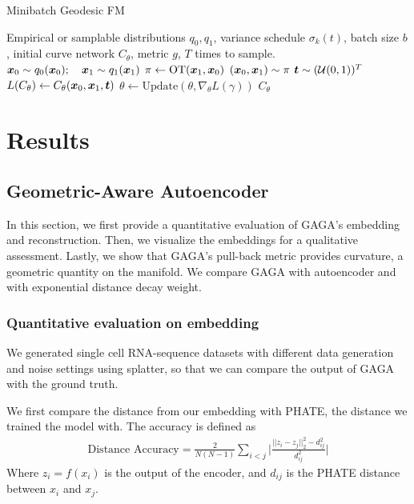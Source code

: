 \documentclass{article}
\theoremstyle{plain}
\theoremstyle{definition}
\theoremstyle{remark}
\newcommand{\methodshort}{GAGA\xspace}
\begin{document}
\begin{algorithm}[htbp]
  \caption{Minibatch Geodesic FM}
  \label{alg:mbotcfm}
\begin{algorithmic}
 Empirical or samplable distributions $q_0,q_1$, variance schedule $\sigma_k(t)$, batch size $b$, initial curve network $C_\theta$, metric $g$, $T$ times to sample.
\State ${\bm{x}}_0 \sim q_0({\bm{x}}_0); \quad {\bm{x}}_1 \sim q_1({\bm{x}}_1)$
\State $\pi \gets \mathrm{OT}({\bm{x}}_1, {\bm{x}}_0)$
\State $({\bm{x}}_0, {\bm{x}}_1) \sim \pi$
\State ${\bm{t}} \sim (\mathcal{U}(0, 1))^T$
\State $L(C_\theta) \gets C_\theta({\bm{x}}_0, {\bm{x}}_1, {\bm{t}})$ 
\State $\theta \gets \mathrm{Update}(\theta, \nabla_\theta L(\gamma))$
\EndWhile
\State \Return $C_\theta$
\end{algorithmic}
\end{algorithm}

\section{Results}
\subsection{Geometric-Aware Autoencoder}
In this section, we first provide a quantitative evaluation of \methodshort's embedding and reconstruction. Then, we visualize the embeddings for a qualitative assessment. Lastly, we show that \methodshort's pull-back metric provides curvature, a geometric quantity on the manifold. We compare \methodshort with autoencoder and with exponential distance decay weight. 
\subsubsection{Quantitative evaluation on embedding}
\par We generated single cell RNA-sequence datasets with different data generation and noise settings using splatter\cite{zappia2017splatter}, so that we can compare the output of \methodshort with the ground truth.
\par We first compare the distance from our embedding with PHATE, the distance we trained the model with. The accuracy is defined as
\begin{align}
    \text{Distance Accuracy}=\frac{2}{N(N-1)}\sum_{i<j}\Bigg|\frac{||z_i-z_j||^2_2-d_{ij}^2}{d^2_{ij}}\Bigg|
\end{align}
Where $z_i=f(x_i)$ is the output of the encoder, and $d_{ij}$ is the PHATE distance between $x_i$ and $x_j$.
\end{document}
